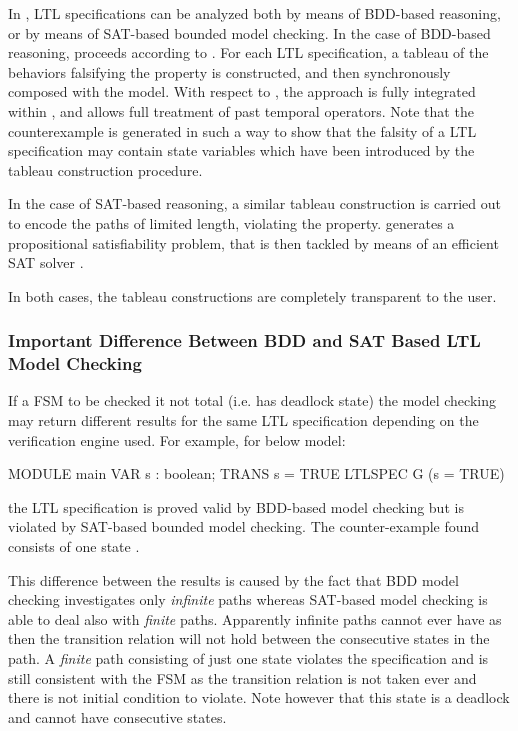 In \nusmv, LTL specifications can be analyzed both by means of
BDD-based reasoning, or by means of SAT-based bounded model
checking. 
%
In the case of BDD-based reasoning, \nusmv proceeds according to
\cite{CGH97}. 
%
For each LTL specification, a tableau of the behaviors falsifying the
property is constructed, and then synchronously composed with the
model. 
%
With respect to \cite{CGH97}, the approach is fully integrated within
\nusmv, and allows full treatment of past temporal operators. 
%
Note that the counterexample is generated in such a way to show that the falsity
of a LTL specification may contain state variables which have been
introduced by the tableau construction procedure.

In the case of SAT-based reasoning, a similar tableau construction is
carried out to encode the paths of limited length, violating the
property.
%
\nusmv generates a propositional satisfiability problem, that is then
tackled by means of an efficient SAT solver \cite{BCCZ99}.

In both cases, the tableau constructions are completely transparent to
the user.

\subsubsection{Important Difference Between BDD and SAT Based LTL Model Checking}
\label{Important Difference Between BDD and SAT Based LTL Model Checking}

If a FSM to be checked it not total (i.e. has deadlock state) the
model checking may return different results for the same LTL
specification depending on the verification engine used.  For
example, for below model:
%
\begin{nusmvCode}
MODULE main
VAR s : boolean;
TRANS s = TRUE
LTLSPEC G (s = TRUE)
\end{nusmvCode}
%
the LTL specification is proved valid by BDD-based model checking but
is violated by SAT-based bounded model checking. The counter-example
found consists of one state .

This difference between the results is caused by the fact that BDD
model checking investigates only \emph{infinite} paths whereas
SAT-based model checking is able to deal also with
\emph{finite} paths.
%
Apparently infinite paths cannot ever have  as then the
transition relation will not hold between the consecutive states in
the path.
%
A \emph{finite} path consisting of just one state 
violates the specification  and is still consistent
with the FSM as the transition relation is not taken ever and there is
not initial condition to violate. Note however that this state is a
deadlock and cannot have consecutive states.

